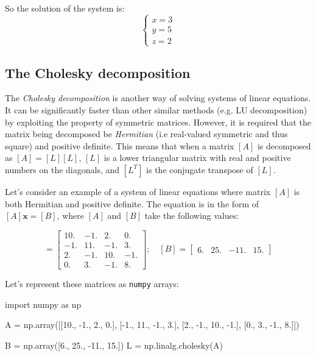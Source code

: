 So the solution of the system is: 
\begin{equation*}
\begin{cases}
x=3\\
y=5\\
z=2
\end{cases}
\end{equation*}

\subsection{The Cholesky decomposition}
\label{sec:cholesky}

The \emph{Cholesky decomposition} is another way of solving systems of linear equations. It can be significantly faster than other similar methods (e.g. LU decomposition) by exploiting the property of symmetric matrices. However, it is required that the matrix being decomposed be \emph{Hermitian} (i.e real-valued symmetric and thus square) and positive definite. This means that when a matrix $[A]$ is decomposed as $[A] = [L][L]$, $[L]$ is a lower triangular matrix with real and positive numbers on the diagonals, and $[L^T]$ is the conjugate transpose of $[L]$.

Let's consider an example of a system of linear equations where matrix $[A]$ is both Hermitian and positive definite. The equation is in the form of $[A]\boldsymbol{x} = [B]$, where $[A]$ and $[B]$ take the following values:

\begin{equation*}
[A] = \begin{bmatrix}
10.& -1.& 2.& 0.\\ 
-1.& 11.& -1.& 3.\\ 
2.& -1.& 10.& -1.\\
0.& 3.& -1.& 8.
\end{bmatrix};\quad
[B] = \begin{bmatrix}
	6.& 25.& -11.& 15.
\end{bmatrix}
\end{equation*}

Let's represent these matrices as \texttt{numpy} arrays:

\begin{ipython}
import numpy as np

A = np.array([[10., -1., 2., 0.], 
              [-1., 11., -1., 3.], 
              [2., -1., 10., -1.],
              [0., 3., -1., 8.]]) 

B = np.array([6., 25., -11., 15.])
L = np.linalg.cholesky(A)
\end{ipython}


